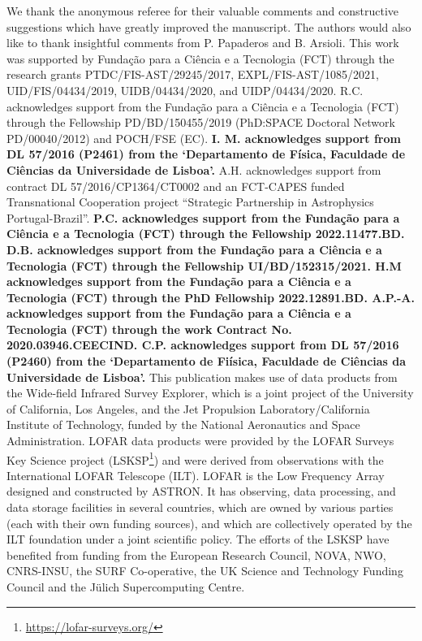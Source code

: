 \documentclass{aa}
\begin{document}
\begin{acknowledgements}
We thank the anonymous referee for their valuable comments
and constructive suggestions which have greatly improved the
manuscript. The authors would also like to thank insightful comments from P. Papaderos and B. Arsioli.
This work was supported by Funda\c{c}\~{a}o para a Ci\^{e}ncia e a Tecnologia (FCT) through the research grants PTDC/FIS-AST/29245/2017, EXPL/FIS-AST/1085/2021, UID/FIS/04434/2019, UIDB/04434/2020, and UIDP/04434/2020. R.C. acknowledges support from the Funda\c{c}\~{a}o para a Ci\^{e}ncia e a Tecnologia (FCT) through the Fellowship PD/BD/150455/2019 (PhD:SPACE Doctoral Network PD/00040/2012) and POCH/FSE (EC). \textbf{I. M. acknowledges support from DL 57/2016 (P2461) from the `Departamento de F\'{i}sica, Faculdade de Ci\^{e}ncias da Universidade de Lisboa'.} A.H. acknowledges support from contract DL 57/2016/CP1364/CT0002 and an FCT-CAPES funded Transnational Cooperation project ``Strategic Partnership in Astrophysics Portugal-Brazil''. \textbf{P.C. acknowledges support from the Funda\c{c}\~{a}o para a Ci\^{e}ncia e a Tecnologia (FCT) through the Fellowship 2022.11477.BD. D.B. acknowledges support from the Funda\c{c}\~{a}o para a Ci\^{e}ncia e a Tecnologia (FCT) through the Fellowship UI/BD/152315/2021. H.M acknowledges support from the Funda\c{c}\~{a}o para a Ci\^{e}ncia e a Tecnologia (FCT) through the PhD Fellowship 2022.12891.BD. A.P.-A. acknowledges support from the Funda\c{c}\~{a}o para a Ci\^{e}ncia e a Tecnologia (FCT) through the work Contract No. 2020.03946.CEECIND. C.P. acknowledges support from DL 57/2016 (P2460) from the `Departamento de Fi\'{i}sica, Faculdade de Ci\^{e}ncias da Universidade de Lisboa'.}
This publication makes use of data products from the Wide-field Infrared Survey Explorer, which is a joint project of the University of California, Los Angeles, and the Jet Propulsion Laboratory/California Institute of Technology, funded by the National Aeronautics and Space Administration.
LOFAR data products were provided by the LOFAR Surveys Key Science project (LSKSP\footnote{\url{https://lofar-surveys.org/}}) and were derived from observations with the International LOFAR Telescope (ILT). LOFAR \citep{2013A&A...556A...2V} is the Low Frequency Array designed and constructed by ASTRON. It has observing, data processing, and data storage facilities in several countries, which are owned by various parties (each with their own funding sources), and which are collectively operated by the ILT foundation under a joint scientific policy. The efforts of the LSKSP have benefited from funding from the European Research Council, NOVA, NWO, CNRS-INSU, the SURF Co-operative, the UK Science and Technology Funding Council and the Jülich Supercomputing Centre.

\end{acknowledgements}
\end{document}
